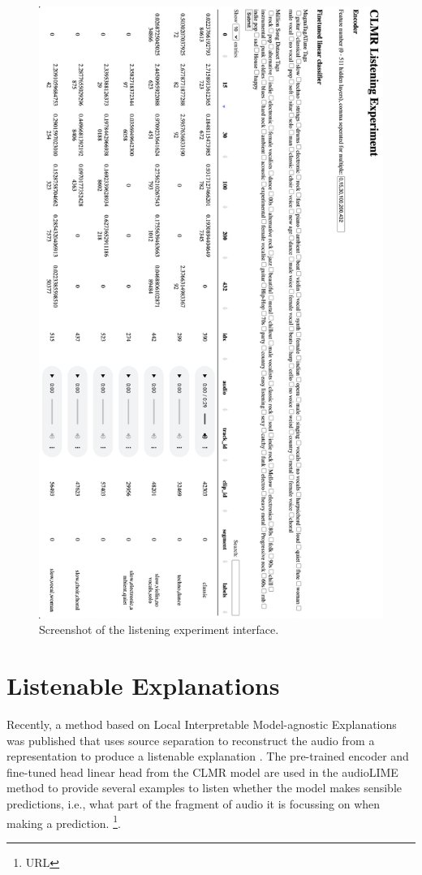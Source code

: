 \begin{figure}[h]
    \centering
    \includegraphics[width=\textwidth]{figs/listening_experiment.png}
    \caption{Screenshot of the listening experiment interface.}
    \label{fig:listening_experiment}
\end{figure}

\section{Listenable Explanations}
Recently, a method based on Local Interpretable Model-agnostic Explanations was published that uses source separation to reconstruct the audio from a representation to produce a listenable explanation \cite{haunschmid2020audiolime}. The pre-trained encoder and fine-tuned head linear head from the CLMR model are used in the audioLIME method to provide several examples to listen whether the model makes sensible predictions, i.e., what part of the fragment of audio it is focussing on when making a prediction. \footnote{URL}.